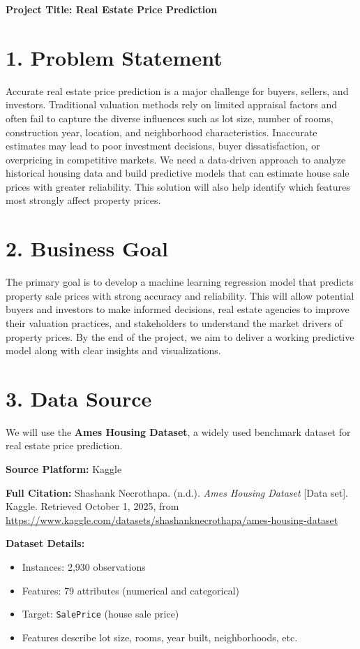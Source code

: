 \documentclass[12pt,a4paper]{article}
\begin{document}

\noindent \textbf{Project Title: Real Estate Price Prediction}

\section*{1. Problem Statement}
Accurate real estate price prediction is a major challenge for buyers, sellers, and investors. Traditional valuation methods rely on limited appraisal factors and often fail to capture the diverse influences such as lot size, number of rooms, construction year, location, and neighborhood characteristics. Inaccurate estimates may lead to poor investment decisions, buyer dissatisfaction, or overpricing in competitive markets. We need a data-driven approach to analyze historical housing data and build predictive models that can estimate house sale prices with greater reliability. This solution will also help identify which features most strongly affect property prices.

\section*{2. Business Goal}
The primary goal is to develop a machine learning regression model that predicts property sale prices with strong accuracy and reliability. This will allow potential buyers and investors to make informed decisions, real estate agencies to improve their valuation practices, and stakeholders to understand the market drivers of property prices. By the end of the project, we aim to deliver a working predictive model along with clear insights and visualizations. 

\section*{3. Data Source}
We will use the \textbf{Ames Housing Dataset}, a widely used benchmark dataset for real estate price prediction.  

\textbf{Source Platform:} Kaggle  

\textbf{Full Citation:}  
Shashank Necrothapa. (n.d.). \textit{Ames Housing Dataset} [Data set]. Kaggle. Retrieved October 1, 2025, from \url{https://www.kaggle.com/datasets/shashanknecrothapa/ames-housing-dataset}  

\textbf{Dataset Details:}
\begin{itemize}
    \item Instances: 2,930 observations
    \item Features: 79 attributes (numerical and categorical)
    \item Target: \texttt{SalePrice} (house sale price)
    \item Features describe lot size, rooms, year built, neighborhoods, etc.
\end{itemize}
\end{document}
